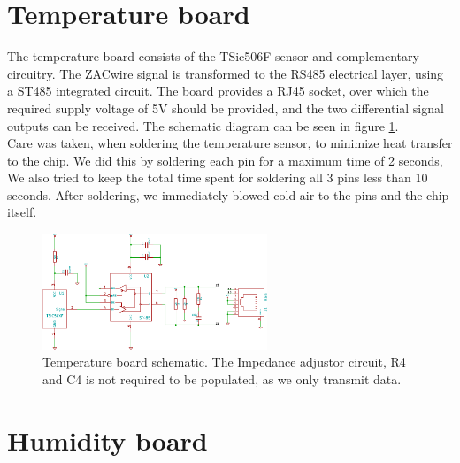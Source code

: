 \documentclass[a4paper]{scrreprt}
\begin{document}
\section{Temperature board} \label{chap:tempbrd}
The temperature board consists of the TSic506F sensor and
complementary circuitry. The ZACwire signal is transformed to the
RS485 electrical layer, using a ST485 integrated circuit. The board
provides a RJ45 socket,  over which the required supply voltage of 5V
should be provided, and the two differential signal outputs can be
received. The schematic diagram can be seen in figure
\ref{fig:schem_temp}.\\
Care was taken, when soldering the temperature sensor, to minimize
heat transfer to the chip. We did this by soldering each pin for a
maximum time of 2 seconds, We also tried to keep the total time spent
for soldering all 3 pins less than 10 seconds. After soldering, we
immediately blowed cold air to the pins and the chip itself.
\begin{figure}
	\centering
	\includegraphics[width=0.6\textwidth]{img/schem_temperature_board.pdf}
	\caption{Temperature board schematic. The Impedance adjustor circuit, R4 and C4 is not required to be populated, as we only transmit data.}
	\label{fig:schem_temp}
\end{figure}
\section{Humidity board}
\end{document}
